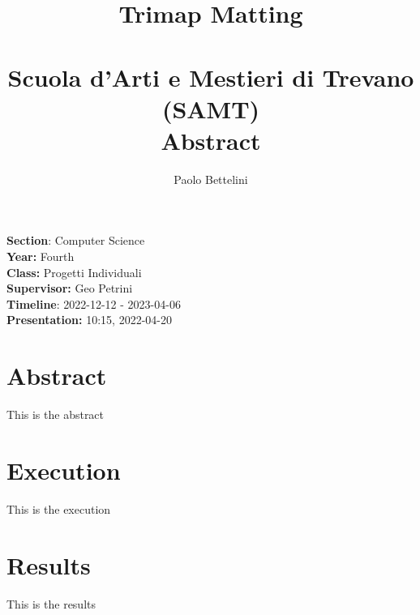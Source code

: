 \documentclass[a4paper]{article}
\title{%
    Trimap Matting \\
    \phantom{} \\
    \large Scuola d'Arti e Mestieri di Trevano (SAMT) \\
    \large Abstract
}
\author{Paolo Bettelini}
\date{}
\begin{document}
\maketitle

\vspace{2cm}

\textbf{Section}: Computer Science \\
\textbf{Year:} Fourth \\
\textbf{Class:} Progetti Individuali \\
\textbf{Supervisor:} Geo Petrini \\
\textbf{Timeline}: 2022-12-12 - 2023-04-06 \\
\textbf{Presentation:} 10:15, 2022-04-20

\vspace{2cm}

\thispagestyle{empty} %

\section*{Abstract}

This is the abstract

\section*{Execution}

This is the execution

\section*{Results}

This is the results
\end{document}
